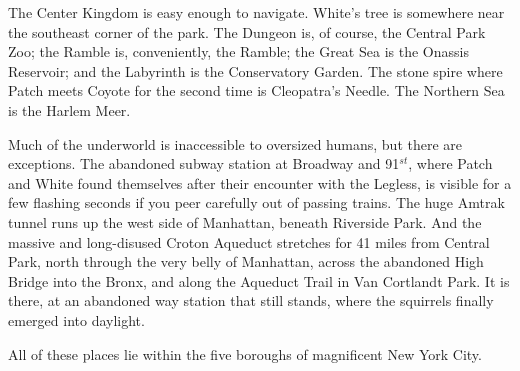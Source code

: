 \documentclass[12pt]{book}
\begin{document}
The Center Kingdom is easy enough to navigate. White's tree is
somewhere near the southeast corner of the park. The Dungeon is, of
course, the Central Park Zoo; the Ramble is, conveniently, the Ramble;
the Great Sea is the Onassis Reservoir; and the Labyrinth is the
Conservatory Garden. The stone spire where Patch meets Coyote for the
second time is Cleopatra's Needle. The Northern Sea is the Harlem
Meer.

Much of the underworld is inaccessible to oversized humans, but there
are exceptions. The abandoned subway station at Broadway and
91$^{st}$, where Patch and White found themselves after their
encounter with the Legless, is visible for a few flashing seconds if
you peer carefully out of passing trains. The huge Amtrak tunnel runs
up the west side of Manhattan, beneath Riverside Park. And the massive
and long-disused Croton Aqueduct stretches for 41 miles from Central
Park, north through the very belly of Manhattan, across the abandoned
High Bridge into the Bronx, and along the Aqueduct Trail in Van
Cortlandt Park. It is there, at an abandoned way station that still
stands, where the squirrels finally emerged into daylight.

All of these places lie within the five boroughs of magnificent New
York City.

\end{document}
